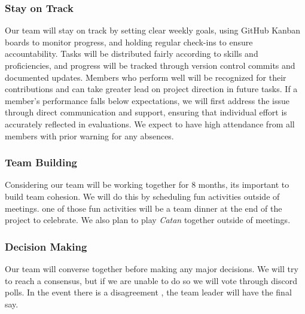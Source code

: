 \documentclass{article}
\begin{document}
\subsubsection*{Stay on Track}

Our team will stay on track by setting clear weekly goals, 
using GitHub Kanban boards to monitor progress, and
holding regular check-ins to ensure accountability. Tasks 
will be distributed fairly according to skills and proficiencies, 
and progress will be tracked through version control commits and 
documented updates. Members who perform well will be recognized 
for their contributions and can take greater lead on project
direction in future tasks. If a member's performance 
falls below expectations, we will first address the issue 
through direct communication and support, ensuring that 
individual effort is accurately reflected in evaluations.
We expect to have high attendance from all members with prior 
warning for any absences.

\subsubsection*{Team Building}


\raggedright
Considering our team will be working together for 8 months, its important to build
team cohesion. We will do this by scheduling fun activities outside of meetings. one
of those fun activities will be a team dinner at the end of the project to celebrate.
We also plan to play \textit{Catan} together outside of meetings. 

\subsubsection*{Decision Making} 


\raggedright
Our team will converse together before making any major decisions. We will try to reach
a consensus, but if we are unable to do so we will vote through discord polls. In the event
there is a disagreement , the team leader will have the final say.
\end{document}
